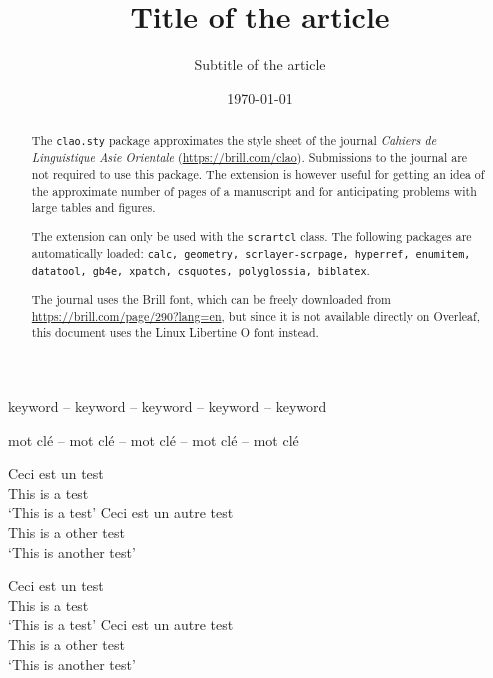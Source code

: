 \documentclass{scrartcl}
\title{Title of the article}
\subtitle{Subtitle of the article}
\date{\today}
\begin{document}
\maketitle

\begin{abstract}
The \texttt{clao.sty} package approximates the style sheet of the journal \textit{Cahiers de Linguistique Asie Orientale} (\url{https://brill.com/clao}). Submissions to the journal are not required to use this package. The extension is however useful for getting an idea of the approximate number of pages of a manuscript and for anticipating problems with large tables and figures.

The extension can only be used with the \texttt{scrartcl} class. The following packages are automatically loaded: \texttt{calc, geometry, scrlayer-scrpage, hyperref, enumitem, datatool, gb4e, xpatch, csquotes, polyglossia, biblatex}.

The journal uses the Brill font, which can be freely downloaded from \url{https://brill.com/page/290?lang=en}, but since it is not available directly on Overleaf, this document uses the Linux Libertine O font instead.\end{abstract}

\begin{keywords}
keyword -- keyword -- keyword -- keyword -- keyword
\end{keywords}

\begin{abstractfr}
\blindtext
\end{abstractfr}

\begin{keywords}
mot clé -- mot clé -- mot clé -- mot clé -- mot clé
\end{keywords}

\begin{exe}
\ex \gll Ceci est un test\\
This is a test\\
\glt \enquote*{This is a test}
\ex \gll Ceci est un autre test\\
This is a other test\\
\glt \enquote*{This is another test}
\end{exe}

\begin{exe}
\ex
\begin{xlist}
\ex \gll Ceci est un test\\
This is a test\\
\glt \enquote*{This is a test}
\ex \gll Ceci est un autre test\\
This is a other test\\
\glt \enquote*{This is another test}
\end{xlist}
\end{exe}

\blinddocument

\nocite{*}
\printbibliography
\end{document}
